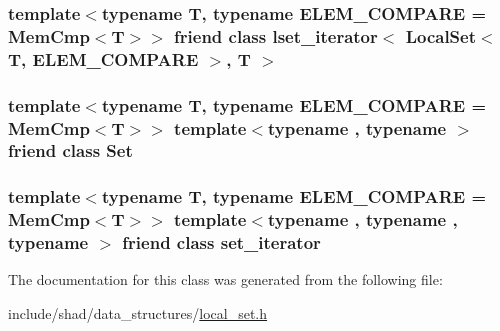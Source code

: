 \hypertarget{classshad_1_1LocalSet_ac228f5f5ba29b686cbd20956e0fe23bc}{
\subsubsection[{lset\-\_\-iterator$<$ Local\-Set$<$ T, E\-L\-E\-M\-\_\-\-C\-O\-M\-P\-A\-R\-E $>$, T $>$}]{\setlength{\rightskip}{0pt plus 5cm}template$<$typename T, typename E\-L\-E\-M\-\_\-\-C\-O\-M\-P\-A\-R\-E = Mem\-Cmp$<$\-T$>$$>$ friend class {\bf lset\-\_\-iterator}$<$ {\bf Local\-Set}$<$ T, E\-L\-E\-M\-\_\-\-C\-O\-M\-P\-A\-R\-E $>$, T $>$\hspace{0.3cm}{\ttfamily [friend]}}}\label{classshad_1_1LocalSet_ac228f5f5ba29b686cbd20956e0fe23bc}
\hypertarget{classshad_1_1LocalSet_abe8ae75525fd5b29f58e1b5537b92ba1}{
\subsubsection[{Set}]{\setlength{\rightskip}{0pt plus 5cm}template$<$typename T, typename E\-L\-E\-M\-\_\-\-C\-O\-M\-P\-A\-R\-E = Mem\-Cmp$<$\-T$>$$>$ template$<$typename , typename $>$ friend class {\bf Set}\hspace{0.3cm}{\ttfamily [friend]}}}\label{classshad_1_1LocalSet_abe8ae75525fd5b29f58e1b5537b92ba1}
\hypertarget{classshad_1_1LocalSet_a51032913d89093f66aa9219f72afe821}{
\subsubsection[{set\-\_\-iterator}]{\setlength{\rightskip}{0pt plus 5cm}template$<$typename T, typename E\-L\-E\-M\-\_\-\-C\-O\-M\-P\-A\-R\-E = Mem\-Cmp$<$\-T$>$$>$ template$<$typename , typename , typename $>$ friend class {\bf set\-\_\-iterator}\hspace{0.3cm}{\ttfamily [friend]}}}\label{classshad_1_1LocalSet_a51032913d89093f66aa9219f72afe821}


The documentation for this class was generated from the following file\-:\begin{DoxyCompactItemize}
\item 
include/shad/data\-\_\-structures/\hyperlink{local__set_8h}{local\-\_\-set.\-h}\end{DoxyCompactItemize}
